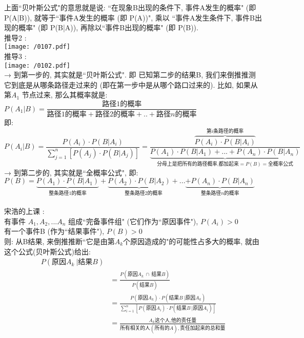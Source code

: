 \documentclass[UTF8]{ctexart}
\begin{document}
上面``贝叶斯公式"的意思就是说: ``在现象B出现的条件下, 事件A发生的概率" (即 P(A|B)), 就等于``事件A发生的概率 (即 P(A))", 乘以 ``事件A发生条件下, 事件B出现的概率" (即 P(B|A)), 再除以``事件B出现的概率" (即 P(B)). \\



推导2 : \\
\texttt{[image: /0107.pdf]} \\




推导3 : \\
\texttt{[image: /0102.pdf]} \\

→ 到第一步的, 其实就是``贝叶斯公式". 即 已知第二步的结果B, 我们来倒推推测它到底是从哪条路径走过来的 (即在第一步中是从哪个路口过来的). 比如, 如果从第$ A_1$ 节点过来, 那么其概率就是:$
P\left( A_1|B \right) =\dfrac{\text{路径1的概率}}{\text{路径1的概率}+\text{路径2的概率}+..+\text{路径}n\text{的概率}}
$ \\
即: \\
$
P\left( A_i|B \right) =\dfrac{P(A_i)\cdot P(B|A_i)}{\sum_{j=1}^n{\left[ P(A_j)\cdot P(B|A_j) \right]}}=\dfrac{\overset{\text{第}i\text{条路径的概率}}{\overbrace{P(A_i)\cdot P(B|A_i)}}}{\underset{\text{分母上是把所有的路径概率,都加起来}=P(B)=\text{全概率公式}}{\underbrace{P(A_1)\cdot P(B|A_1)+...+P(A_n)\cdot P(B|A_n)}}}
$ \\

→ 到第二步的, 其实就是``全概率公式", 即: \\
$
P(B)=\underset{\text{整条路径1的概率}}{\underbrace{P(A_1)\cdot P(B|A_1)}}+\underset{\text{整条路径2的概率}}{\underbrace{P(A_2)\cdot P(B|A_2)}+}...\underset{\text{整条路径}n\text{的概率}}{\underbrace{+P(A_n)\cdot P(B|A_n)}}
$ \\
~\\



宋浩的上课 : \\
有事件 $A_1, A_2, ... A_n$ 组成``完备事件组" (它们作为``原因事件"), $P(A_i) > 0$ \\
有一个事件B (作为``结果事件"), $P(B) > 0$ \\

则: 从B结果, 来倒推推断``它是由第$A_k$个原因造成的"的可能性占多大的概率, 就由这个公式(贝叶斯公式)给出: \\
\begin{align*}  %
	P(\text{原因}A_k\ |\text{结果}B)\\
&=\frac{P(\text{原因}A_k\ \cap \ \text{结果}B)}{P(\text{结果}B)}\\
&=\frac{P\left( \text{原因}A_k \right) \cdot P\left( \text{结果}B\ |\text{原因}A_k \right)}{\sum_{i=1}^n{\left[ P\left( \text{原因}A_i \right) \cdot P\left( \text{结果}B\ |\text{原因}A_i \right) \right]}}\\
&=\frac{A_k\text{这个人,他的责任量}}{\text{所有相关的人}(\text{所有的}A),\text{责任加起来的总和量}} 
\end{align*}
\\
\end{document}
